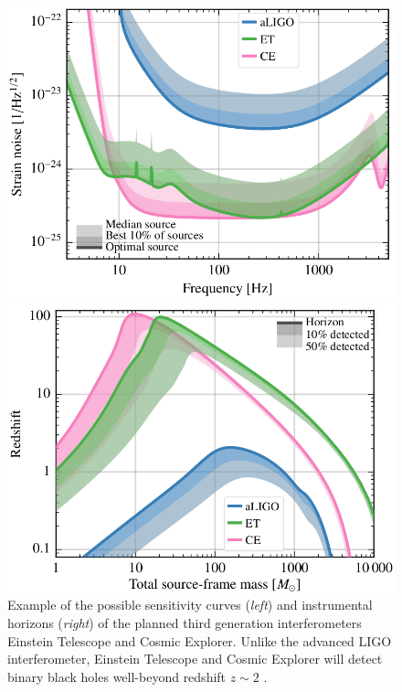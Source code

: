 \documentclass[a4paper,titlepage]{book}     	%
\begin{document}
\begin{figure}[h]
	\begin{minipage}{.49\textwidth}
		\centering
		\includegraphics[width=\textwidth]{./images/ETsensitivity.png}
	\end{minipage}
	\hfill
	\begin{minipage}{.49\textwidth}
		\vspace{-2mm}
		\centering
		\includegraphics[width=1.02\textwidth]{./images/EThorizon.png}	
	\end{minipage}
	\caption{Example of the possible sensitivity curves (\emph{left}) and instrumental horizons (\emph{right}) of the planned third generation interferometers Einstein Telescope and Cosmic Explorer. Unlike the advanced LIGO interferometer, Einstein Telescope and Cosmic Explorer will detect binary black holes well-beyond redshift $z \sim 2$ \cite{EThorizonsensitivity}.}\label{fig:ETsensitivity}
\end{figure}
\end{document}
